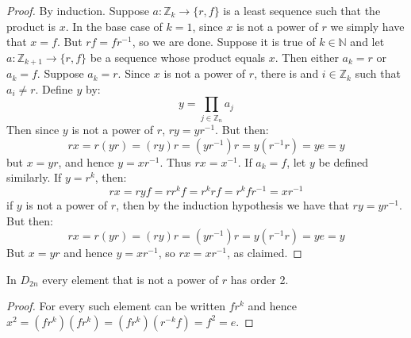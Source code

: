 \documentclass{article}                                                        %
\begin{document}
            \begin{proof}
                By induction. Suppose $a:\mathbb{Z}_{k}\rightarrow\{r,f\}$ is
                a least sequence such that the product is $x$. In the base case
                of $k=1$, since $x$ is not a power of $r$ we simply have that
                $x=f$. But $rf=fr^{\minus{1}}$, so we are done. Suppose it is
                true of $k\in\mathbb{N}$ and let
                $a:\mathbb{Z}_{k+1}\rightarrow\{r,f\}$ be a sequence whose
                product equals $x$. Then either $a_{k}=r$ or $a_{k}=f$. Suppose
                $a_{k}=r$. Since $x$ is not a power of $r$, there is and
                $i\in\mathbb{Z}_{k}$ such that $a_{i}\ne{r}$. Define $y$ by:
                \begin{equation}
                    y=\prod_{j\in\mathbb{Z}_{n}}a_{j}
                \end{equation}
                Then since $y$ is not a power of $r$, $ry=yr^{\minus{1}}$. But
                then:
                \begin{equation}
                    rx=r(yr)=(ry)r=(yr^{\minus{1}})r=y(r^{\minus{1}}r)=ye=y
                \end{equation}
                but $x=yr$, and hence $y=xr^{\minus{1}}$. Thus
                $rx=x^{\minus{1}}$. If $a_{k}=f$, let $y$ be defined similarly.
                If $y=r^{k}$, then:
                \begin{equation}
                    rx=ryf=rr^{k}f=r^{k}rf=r^{k}fr^{\minus{1}}=xr^{\minus{1}}
                \end{equation}
                if $y$ is not a power of $r$, then by the induction hypothesis
                we have that $ry=yr^{\minus{1}}$. But then:
                \begin{equation}
                    rx=r(yr)=(ry)r=(yr^{\minus{1}})r=y(r^{\minus{1}}r)=ye=y
                \end{equation}
                But $x=yr$ and hence $y=xr^{\minus{1}}$, so $rx=xr^{\minus{1}}$,
                as claimed.
            \end{proof}
            \begin{theorem}
                In $D_{2n}$ every element that is not a power of $r$ has order
                2.
            \end{theorem}
            \begin{proof}
                For every such element can be written $fr^{k}$ and hence
                $x^{2}=(fr^{k})(fr^{k})=(fr^{k})(r^{\minus{k}}f)=f^{2}=e$.
            \end{proof}
\end{document}
